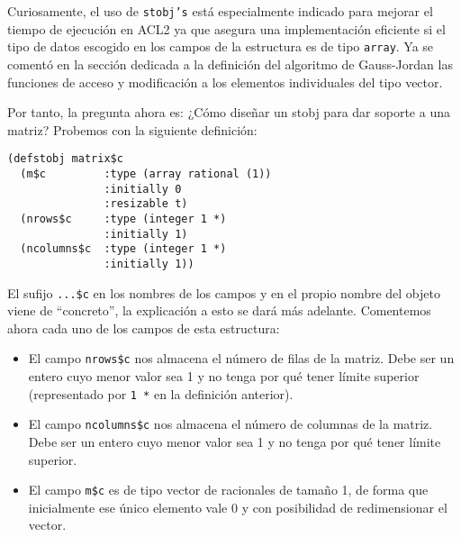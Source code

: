 \documentclass[a4paper,10pt]{article}
\begin{document}
Curiosamente, el uso de \texttt{stobj's} está especialmente indicado para mejorar el tiempo de ejecución en ACL2 ya que asegura una implementación eficiente si el tipo de datos escogido en los campos de la estructura es de tipo \texttt{array}. Ya se comentó en la sección dedicada a la definición del algoritmo de Gauss-Jordan las funciones de acceso y modificación a los elementos individuales del tipo vector.

\par \vspace{10pt}

Por tanto, la pregunta ahora es: ¿Cómo diseñar un stobj para dar soporte a una matriz? Probemos con la siguiente definición:

\par \vspace{10pt}

\begin{lstlisting}[language=clips]
(defstobj matrix$c
  (m$c         :type (array rational (1))     
               :initially 0 
               :resizable t)
  (nrows$c     :type (integer 1 *)                 
               :initially 1)
  (ncolumns$c  :type (integer 1 *)            
               :initially 1))
\end{lstlisting}

\par \vspace{10pt}

El sufijo \texttt{...\$c} en los nombres de los campos y en el propio nombre del objeto viene de ``concreto'', la explicación a esto se dará más adelante. Comentemos ahora cada uno de los campos de esta estructura:

\par \vspace{10pt}

\begin{itemize}
	\item El campo \texttt{nrows\$c} nos almacena el número de filas de la matriz. Debe ser un entero cuyo menor valor sea 1 y no tenga por qué tener límite superior (representado por \texttt{1 *} en la definición anterior).
	\item El campo \texttt{ncolumns\$c} nos almacena el número de columnas de la matriz. Debe ser un entero cuyo menor valor sea 1 y no tenga por qué tener límite superior.
	\item El campo \texttt{m\$c} es de tipo vector de racionales de tamaño 1, de forma que inicialmente ese único elemento vale 0 y con posibilidad de redimensionar el vector.
\end{itemize}
\end{document}
